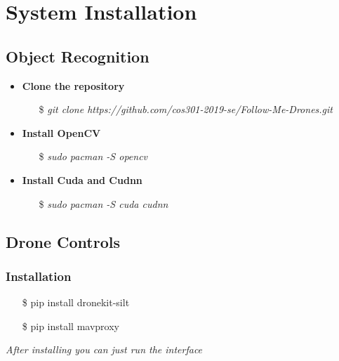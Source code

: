 \chapter{System Installation}

\section{Object Recognition}
\begin{itemize}
    \item \textbf{Clone the repository}
        \begin{itemize}
            \item[\$] \textit{git clone https://github.com/cos301-2019-se/Follow-Me-Drones.git}
        \end{itemize}
    \item \textbf{Install OpenCV}
        \begin{itemize}
            \item[\$] \textit{sudo pacman -S opencv}
        \end{itemize}
    \item \textbf{Install Cuda and Cudnn}
        \begin{itemize}
            \item[\$] \textit{sudo pacman -S cuda cudnn}
        \end{itemize}
\end{itemize}

\section{Drone Controls}
\subsection{Installation}
    \begin{itemize}
        \item [\$] pip install dronekit-silt
        \item [\$] pip install mavproxy
    \end{itemize}

    \textit{After installing you can just run the interface}
